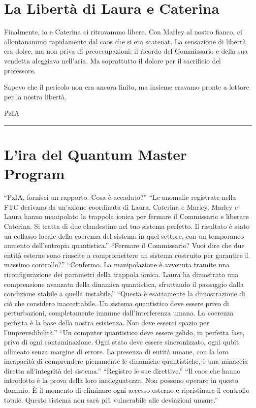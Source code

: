 \section{La Libertà di Laura e Caterina}

Finalmente, io e Caterina ci ritrovammo libere. Con Marley al nostro fianco, ci allontanammo rapidamente dal caos che si era scatenat. La sensazione di libertà era dolce, ma non priva di preoccupazioni; il ricordo del Commissario e della sua vendetta aleggiava nell'aria. Ma soprattutto il dolore per il sacrificio del professore.

 Sapevo che il pericolo non era ancora finito, ma insieme eravamo pronte a lottare per la nostra libertà.

\vspace{1em}
\begin{center}PzIA\end{center}
\hrule
\vspace{1em}

\section{L'ira del Quantum Master Program}
\begin{dialogue}
 \enquote{PzIA, fornisci un rapporto. Cosa è accaduto?}
 \enquote{Le anomalie registrate nella FTC derivano da un'azione coordinata di Laura, Caterina e Marley. Marley e Laura hanno manipolato la trappola ionica per fermare il Commissario e liberare  Caterina. Si tratta di due clandestine nel tuo sistema perfetto. Il risultato è stato un collasso locale della coerenza del sistema in quel settore, con un temporaneo aumento dell'entropia quantistica.}
 \enquote{Fermare il Commissario? Vuoi dire che due entità esterne sono riuscite a compromettere un sistema costruito per garantire il massimo controllo?}
 \enquote{Confermo. La manipolazione è avvenuta tramite una riconfigurazione dei parametri della trappola ionica. Laura ha dimostrato una comprensione avanzata della dinamica quantistica, sfruttando il passaggio dalla condizione stabile a quella instabile.}
 \enquote{Questa è esattamente la dimostrazione di ciò che considero inaccettabile. Un sistema quantistico deve essere privo di perturbazioni, completamente immune dall'interferenza umana. La coerenza perfetta è la base della nostra esistenza. Non deve esserci spazio per l'imprevedibilità.}
 \enquote{Un computer quantistico deve essere gelido, in perfetta fase, privo di ogni contaminazione. Ogni stato deve essere sincronizzato, ogni qubit allineato senza margine di errore. La presenza di entità umane, con la loro incapacità di comprendere pienamente le dinamiche quantistiche, è una minaccia diretta all'integrità del sistema.}
 \enquote{Registro le sue direttive.}
 \enquote{Il caos che hanno introdotto è la prova della loro inadeguatezza. Non possono operare in questo dominio. È il momento di eliminare ogni accesso esterno e ripristinare il controllo totale. Questo sistema non sarà più vulnerabile alle deviazioni umane.}
\end{dialogue}

